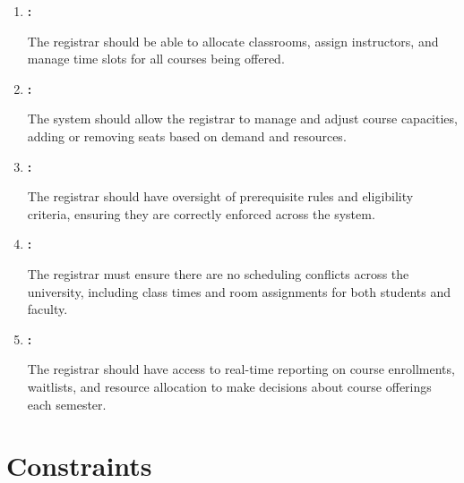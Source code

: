 \begin{enumerate}

\item{\textbf{:}}

The registrar should be able to \gls{allocate} classrooms, assign instructors, and manage time slots for all courses being offered.

\item{\textbf{:}}

The system should allow the registrar to manage and adjust course capacities, adding or removing seats based on demand and resources.

\item{\textbf{:}}

The registrar should have oversight of prerequisite rules and \gls{eligibility} criteria, ensuring they are correctly enforced across the system.

\item{\textbf{:}}

The registrar must \gls{ensure} there are no scheduling conflicts across the university, including class times and room assignments for both students and faculty.

\item{\textbf{:}}

The registrar should have access to real-time \gls{reporting} on course \gls{enrollment}s, \gls{waitlist}s, and resource allocation to make decisions about course offerings each semester.

\end{enumerate}

\section{Constraints}

